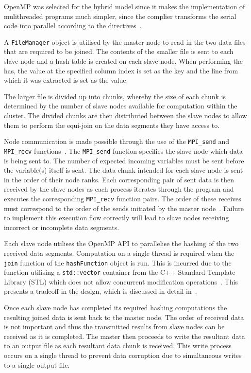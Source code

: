 \documentclass[10pt,twocolumn]{witseiepaper}
\begin{document}
OpenMP was selected for the hybrid model since it makes the implementation of mulithreaded programs much simpler, since the complier transforms the serial code into parallel according to the directives~\cite{comparingMPIMapReduce}.

A \texttt{FileManager} object is utilised by the master node to read in the two data files that are required to be joined. The contents of the smaller file is sent to each slave node and a hash table is created on each slave node. When performing the has, the value at the specified column index is set as the key and the line from which it was extracted is set as the value.

The larger file is divided up into chunks, whereby the size of each chunk is determined by the number of slave nodes available for computation within the cluster. The divided chunks are then distributed between the slave nodes to allow them to perform the equi-join on the data segments they have access to.

Node communication is made possible through the use of the \texttt{MPI\_send} and \texttt{MPI\_recv} functions~\cite{mpi-send}. The \texttt{MPI\_send} function specifies the slave node which data is being sent to. The number of expected incoming variables must be sent before the variable(s) itself is sent. The data chunk intended for each slave node is sent in the order of their node ranks. Each corresponding pair of sent data is then received by the slave nodes as each process iterates through the program and executes the corresponding \texttt{MPI\_recv} function pairs. The order of these receives must correspond to the order of the sends initiated by the master node~\cite{mpi-send}. Failure to implement this execution flow correctly will lead to slave nodes receiving incorrect or incomplete data segments.

Each slave node utilises the OpenMP API to parallelise the hashing of the two received data segments. Computation on a single thread is required when the \texttt{join} function of the \texttt{hashFunction} object is run. This is incurred due to the function utilising a \texttt{std::vector} container from the C++ Standard Template Library (STL) which does not allow concurrent modification operations~\cite{stl-vector}. This presents a tradeoff in the design, which is discussed in detail in~.

Once each slave node has completed its required hashing computations the resulting joined data is sent back to the master node. The order of received data is not important and thus the transmitted results from slave nodes can be received as it is completed. The master then proceeds to write the resultant data to an output file as each resultant data chunk is received. This write process occurs on a single thread to prevent data corruption due to simultaneous writes to a single output file.
\end{document}
